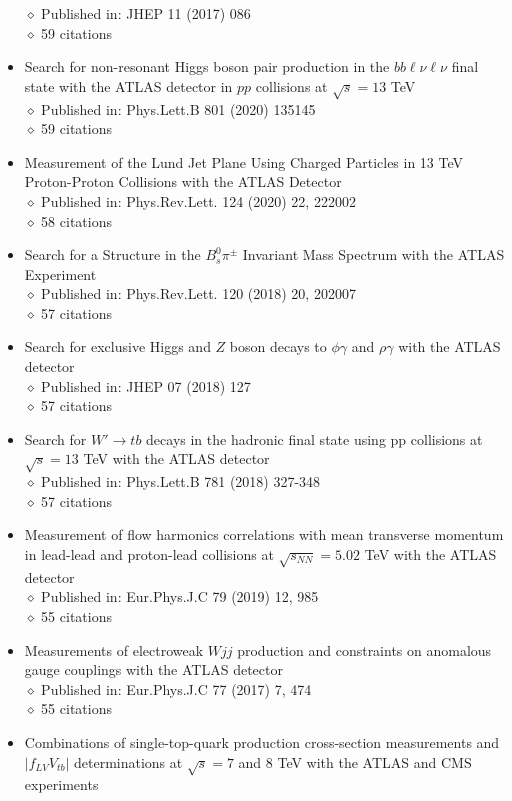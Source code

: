\documentclass[margin, 10pt]{res} %
\begin{document}
\begin{resume}
\begin{itemize}
$\diamond$ Published in: JHEP 11 (2017) 086\\
$\diamond$ 59 citations
\item Search for non-resonant Higgs boson pair production in the $bb\ell\nu\ell\nu$ final state with the ATLAS detector in $pp$ collisions at $\sqrt{s} = 13$ TeV\\
$\diamond$ Published in: Phys.Lett.B 801 (2020) 135145\\
$\diamond$ 59 citations
\item Measurement of the Lund Jet Plane Using Charged Particles in 13 TeV Proton-Proton Collisions with the ATLAS Detector\\
$\diamond$ Published in: Phys.Rev.Lett. 124 (2020) 22, 222002\\
$\diamond$ 58 citations
\item Search for a Structure in the $B^{0}_{s}\pi^{\pm}$ Invariant Mass Spectrum with the ATLAS Experiment\\
$\diamond$ Published in: Phys.Rev.Lett. 120 (2018) 20, 202007\\
$\diamond$ 57 citations
\item Search for exclusive Higgs and $Z$ boson decays to $\phi\gamma$ and $\rho\gamma$ with the ATLAS detector\\
$\diamond$ Published in: JHEP 07 (2018) 127\\
$\diamond$ 57 citations
\item Search for $W' \rightarrow tb$ decays in the hadronic final state using pp collisions at $\sqrt{s} = 13$ TeV with the ATLAS detector\\
$\diamond$ Published in: Phys.Lett.B 781 (2018) 327-348\\
$\diamond$ 57 citations
\item Measurement of flow harmonics correlations with mean transverse momentum in lead-lead and proton-lead collisions at $\sqrt{s_{NN}} = 5.02$ TeV with the ATLAS detector\\
$\diamond$ Published in: Eur.Phys.J.C 79 (2019) 12, 985\\
$\diamond$ 55 citations
\item Measurements of electroweak $Wjj$ production and constraints on anomalous gauge couplings with the ATLAS detector\\
$\diamond$ Published in: Eur.Phys.J.C 77 (2017) 7, 474\\
$\diamond$ 55 citations
\item Combinations of single-top-quark production cross-section measurements and $|f_{LV}V_{tb}|$ determinations at $\sqrt{s} = 7$ and 8 TeV with the ATLAS and CMS experiments\\

\end{itemize}
\end{resume}
\end{document}

